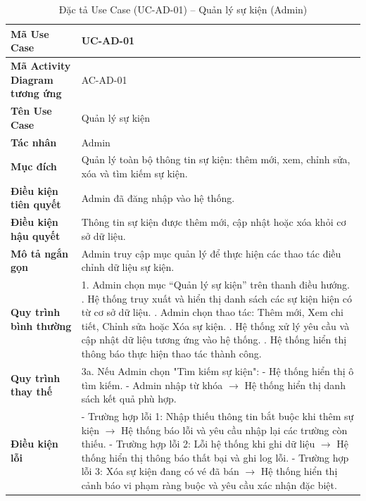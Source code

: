 \renewcommand{\arraystretch}{1.3}
\setlength{\tabcolsep}{4pt}
\begin{longtable}{|p{}|p{}|}
\caption{Đặc tả Use Case (UC-AD-01) -- Quản lý sự kiện (Admin)}\label{tab:uc_manage_events}\\
\hline
\textbf{Mã Use Case} & UC-AD-01 \\ \hline
\textbf{Mã Activity Diagram tương ứng} & AC-AD-01 \\ \hline
\textbf{Tên Use Case} & Quản lý sự kiện \\ \hline
\textbf{Tác nhân} & Admin \\ \hline
\textbf{Mục đích} & Quản lý toàn bộ thông tin sự kiện: thêm mới, xem, chỉnh sửa, xóa và tìm kiếm sự kiện. \\ \hline
\textbf{Điều kiện tiên quyết} & Admin đã đăng nhập vào hệ thống. \\ \hline
\textbf{Điều kiện hậu quyết} & Thông tin sự kiện được thêm mới, cập nhật hoặc xóa khỏi cơ sở dữ liệu. \\ \hline
\textbf{Mô tả ngắn gọn} & Admin truy cập mục quản lý để thực hiện các thao tác điều chỉnh dữ liệu sự kiện. \\ \hline
\textbf{Quy trình bình thường} &
1. Admin chọn mục “Quản lý sự kiện” trên thanh điều hướng. \newline
2. Hệ thống truy xuất và hiển thị danh sách các sự kiện hiện có từ cơ sở dữ liệu. \newline
3. Admin chọn thao tác: Thêm mới, Xem chi tiết, Chỉnh sửa hoặc Xóa sự kiện. \newline
4. Hệ thống xử lý yêu cầu và cập nhật dữ liệu tương ứng vào hệ thống. \newline
5. Hệ thống hiển thị thông báo thực hiện thao tác thành công. \\ \hline
\textbf{Quy trình thay thế} &
3a. Nếu Admin chọn "Tìm kiếm sự kiện": \newline
- Hệ thống hiển thị ô tìm kiếm. \newline
- Admin nhập từ khóa $\rightarrow$ Hệ thống hiển thị danh sách kết quả phù hợp. \\ \hline
\textbf{Điều kiện lỗi} &
- Trường hợp lỗi 1: Nhập thiếu thông tin bắt buộc khi thêm sự kiện $\rightarrow$ Hệ thống báo lỗi và yêu cầu nhập lại các trường còn thiếu. \newline
- Trường hợp lỗi 2: Lỗi hệ thống khi ghi dữ liệu $\rightarrow$ Hệ thống hiển thị thông báo thất bại và ghi log lỗi. \newline
- Trường hợp lỗi 3: Xóa sự kiện đang có vé đã bán $\rightarrow$ Hệ thống hiển thị cảnh báo vi phạm ràng buộc và yêu cầu xác nhận đặc biệt. \\ \hline
\end{longtable}

